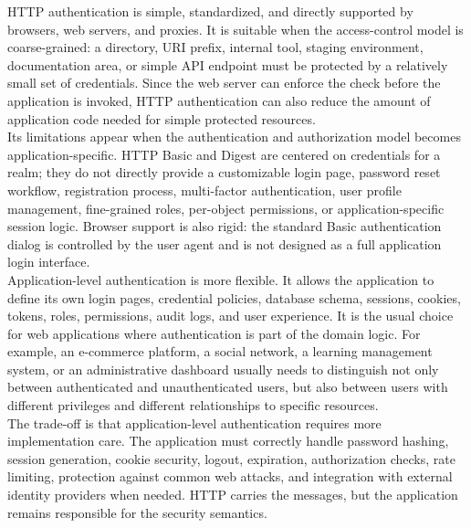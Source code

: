 \documentclass{scrbook}
\begin{document}
HTTP authentication is simple, standardized, and directly supported by browsers, web servers, and proxies. It is suitable when the access-control model is coarse-grained: a directory, URI prefix, internal tool, staging environment, documentation area, or simple API endpoint must be protected by a relatively small set of credentials. Since the web server can enforce the check before the application is invoked, HTTP authentication can also reduce the amount of application code needed for simple protected resources.\\

Its limitations appear when the authentication and authorization model becomes application-specific. HTTP Basic and Digest are centered on credentials for a realm; they do not directly provide a customizable login page, password reset workflow, registration process, multi-factor authentication, user profile management, fine-grained roles, per-object permissions, or application-specific session logic. Browser support is also rigid: the standard Basic authentication dialog is controlled by the user agent and is not designed as a full application login interface.\\

Application-level authentication is more flexible. It allows the application to define its own login pages, credential policies, database schema, sessions, cookies, tokens, roles, permissions, audit logs, and user experience. It is the usual choice for web applications where authentication is part of the domain logic. For example, an e-commerce platform, a social network, a learning management system, or an administrative dashboard usually needs to distinguish not only between authenticated and unauthenticated users, but also between users with different privileges and different relationships to specific resources.\\

The trade-off is that application-level authentication requires more implementation care. The application must correctly handle password hashing, session generation, cookie security, logout, expiration, authorization checks, rate limiting, protection against common web attacks, and integration with external identity providers when needed. HTTP carries the messages, but the application remains responsible for the security semantics.
\end{document}
